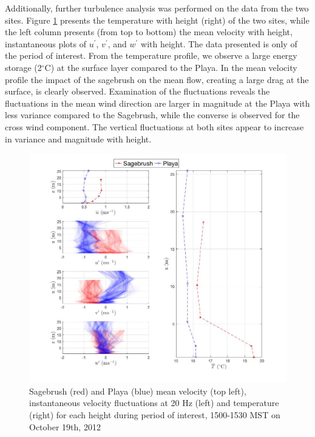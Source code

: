 \documentclass[]{article}
\begin{document}
Additionally, further turbulence analysis was performed on the data from the two sites. Figure \ref{fig:u_T} presents the temperature with height (right) of the two sites, while the left column presents (from top to bottom) the mean velocity with height, instantaneous plots of $u^\prime$,  $v^\prime$, and $w^\prime$ with height. The data presented is only of the period of interest. From the temperature profile, we observe a large energy storage (2$^\circ$C) at the surface layer compared to the Playa. In the mean velocity profile the impact of the sagebrush on the mean flow, creating a large drag at the surface, is clearly observed. Examination of the fluctuations reveals the fluctuations in the mean wind direction are larger in magnitude at the Playa with less variance compared to the Sagebrush, while the converse is observed for the cross wind component. The vertical fluctuations at both sites appear to increase in variance and magnitude with height.  
\begin{figure}
	\centering
	\includegraphics[width=\textwidth]{u_T}
	\caption{Sagebrush (red) and Playa (blue) mean velocity (top left), instantaneous velocity fluctuations at 20 Hz (left) and temperature (right) for each height during period of interest, 1500-1530 MST on October 19th, 2012}
	\label{fig:u_T}
\end{figure}
\end{document}
